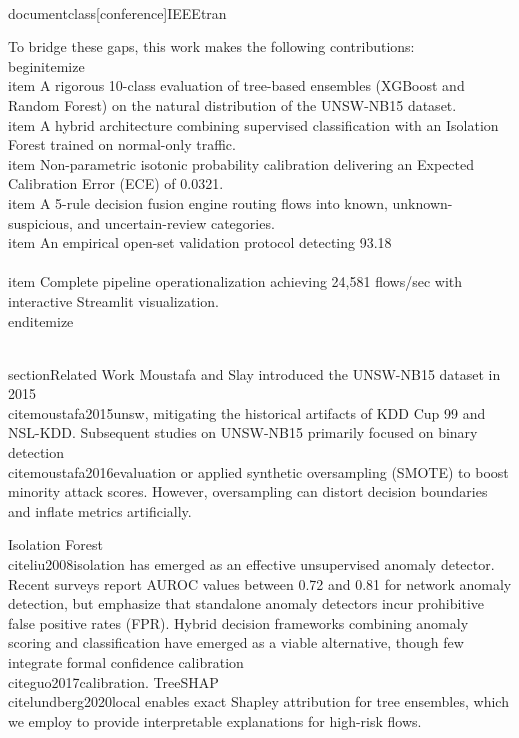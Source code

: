 \\documentclass[conference]{IEEEtran}
\begin{document}
To bridge these gaps, this work makes the following contributions:
\\begin{itemize}
    \\item A rigorous 10-class evaluation of tree-based ensembles (XGBoost and Random Forest) on the natural distribution of the UNSW-NB15 dataset.
    \\item A hybrid architecture combining supervised classification with an Isolation Forest trained on normal-only traffic.
    \\item Non-parametric isotonic probability calibration delivering an Expected Calibration Error (ECE) of 0.0321.
    \\item A 5-rule decision fusion engine routing flows into known, unknown-suspicious, and uncertain-review categories.
    \\item An empirical open-set validation protocol detecting 93.18\\%
    \\item Complete pipeline operationalization achieving 24,581 flows/sec with interactive Streamlit visualization.
\\end{itemize}

\\section{Related Work}
Moustafa and Slay introduced the UNSW-NB15 dataset in 2015 \\cite{moustafa2015unsw}, mitigating the historical artifacts of KDD Cup 99 and NSL-KDD. Subsequent studies on UNSW-NB15 primarily focused on binary detection \\cite{moustafa2016evaluation} or applied synthetic oversampling (SMOTE) to boost minority attack scores. However, oversampling can distort decision boundaries and inflate metrics artificially.

Isolation Forest \\cite{liu2008isolation} has emerged as an effective unsupervised anomaly detector. Recent surveys report AUROC values between 0.72 and 0.81 for network anomaly detection, but emphasize that standalone anomaly detectors incur prohibitive false positive rates (FPR). Hybrid decision frameworks combining anomaly scoring and classification have emerged as a viable alternative, though few integrate formal confidence calibration \\cite{guo2017calibration}. TreeSHAP \\cite{lundberg2020local} enables exact Shapley attribution for tree ensembles, which we employ to provide interpretable explanations for high-risk flows.
\end{document}
